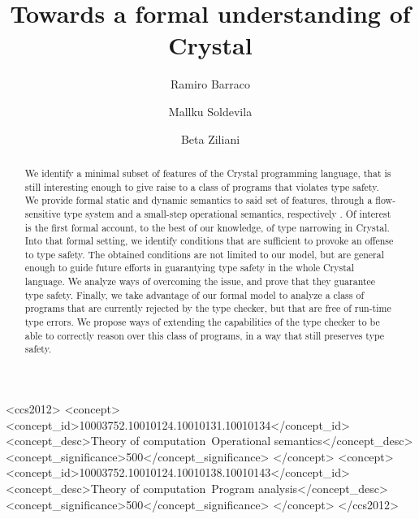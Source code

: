 \documentclass[format=sigconf]{acmart}
\begin{document}
\title{Towards a formal understanding of Crystal}


\author{Ramiro Barraco}

\author{Mallku Soldevila}

\author{Beta Ziliani}

\begin{CCSXML}
<ccs2012>
   <concept>
       <concept_id>10003752.10010124.10010131.10010134</concept_id>
       <concept_desc>Theory of computation~Operational semantics</concept_desc>
       <concept_significance>500</concept_significance>
       </concept>
   <concept>
       <concept_id>10003752.10010124.10010138.10010143</concept_id>
       <concept_desc>Theory of computation~Program analysis</concept_desc>
       <concept_significance>500</concept_significance>
       </concept>
 </ccs2012>
\end{CCSXML}


\begin{abstract}
  We identify a minimal subset of features of the Crystal programming language, that is
still interesting enough to give raise to a class of programs that violates type safety. We
provide formal static and dynamic semantics to said set of features, through a flow-sensitive
type system and a small-step operational semantics, respectively . Of interest is
the first formal account, to the best of our knowledge, of type narrowing in
Crystal. Into that formal setting, we identify conditions that are sufficient to provoke an
offense to type safety. The obtained conditions are not limited to our model, but are
general enough to guide future efforts in guarantying type safety in the whole Crystal
language. We analyze ways of overcoming the issue, and prove that they guarantee
type safety. Finally, we take advantage of our formal model to analyze a class of
programs that are currently rejected by the type checker, but that are free of run-time
type errors. We propose ways of extending the capabilities of the type checker to be
able to correctly reason over this class of programs, in a way that still preserves type
safety.

\end{abstract}


\maketitle





% 


\end{document}
